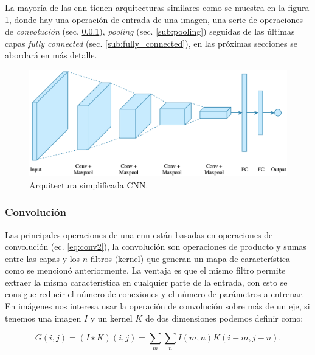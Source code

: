 La mayoría de las \ac{cnn} tienen arquitecturas similares como se muestra en la figura \ref{Fig:cnn_network}, donde hay una operación de entrada de una imagen, una serie de operaciones de  \textit{convolución} (sec. \ref{sub:convolucion}),  \textit{pooling} (sec. \ref{sub:pooling}) seguidas de las últimas capas \textit{fully connected} (sec. \ref{sub:fully_connected}), en las próximas secciones se abordará en más detalle. 

\begin{figure}[H]\centering
  \includegraphics[scale=0.2,keepaspectratio=true,clip=true]{imagenes/MarcoTeorico/cnn_intuition.png}
  \caption{Arquitectura simplificada CNN.}
  \label{Fig:cnn_network}
\end{figure}




\subsubsection{Convolución}\label{sub:convolucion}
Las principales operaciones de una \ac{cnn} están basadas en operaciones de convolución (ec. \eqref{eq:conv2}), la convolución son operaciones de producto y sumas entre las capas y los $n$ filtros (kernel) que generan  un mapa de característica como se mencionó anteriormente. La ventaja es que el mismo filtro permite extraer la misma característica en cualquier parte de la entrada, con esto se consigue reducir el número de conexiones y el número de parámetros a entrenar. En imágenes nos interesa usar la operación de convolución sobre más de un eje,  si tenemos una imagen $I$ y un kernel $K$ de dos dimensiones podemos definir como:

\begin{equation}\label{eq:conv2}
    G(i, j) = (I ∗ K)(i, j) = \sum_{m} \sum_{n} I(m, n) K(i - m, j - n).
\end{equation} 

